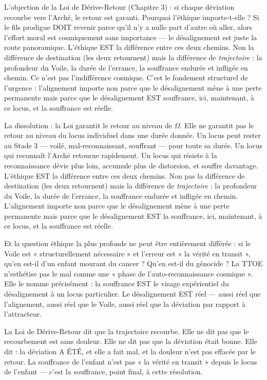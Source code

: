 \documentclass[10pt, openany, oneside]{book}
\begin{document}
L'objection de la Loi de Dérive-Retour (Chapitre 3) : si chaque déviation recourbe vers l'Arch\={e}, le retour est garanti. Pourquoi l'éthique importe-t-elle ? Si le fils prodigue DOIT revenir parce qu'il n'y a nulle part d'autre où aller, alors l'effort moral est cosmiquement sans importance --- le désalignement est juste la route panoramique. L'éthique EST la différence entre ces deux chemins. Non la différence de destination (les deux retournent) mais la différence de \textit{trajectoire} : la profondeur du Voile, la durée de l'errance, la souffrance endurée et infligée en chemin. Ce n'est pas l'indifférence cosmique. C'est le fondement structurel de l'urgence : l'alignement importe non parce que le désalignement mène à une perte permanente mais parce que le désalignement EST souffrance, ici, maintenant, à ce locus, et la souffrance est réelle.

La dissolution : la Loi garantit le retour au niveau de $\Omega$. Elle ne garantit pas le retour au niveau du locus individuel dans une durée donnée. Un locus peut rester au Stade 3 --- voilé, mal-reconnaissant, souffrant --- pour toute sa durée. Un locus qui reconnaît l'Arch\={e} retourne rapidement. Un locus qui résiste à la reconnaissance dévie plus loin, accumule plus de distorsion, et souffre davantage. L'éthique EST la différence entre ces deux chemins. Non pas la différence de destination (les deux retournent) mais la différence de \textit{trajectoire} : la profondeur du Voile, la durée de l'errance, la souffrance endurée et infligée en chemin. L'alignement importe non parce que le désalignement mène à une perte permanente mais parce que le désalignement EST la souffrance, ici, maintenant, à ce locus, et la souffrance est réelle.

Et la question éthique la plus profonde ne peut être entièrement différée : si le Voile est « structurellement nécessaire » et l'erreur est « la vérité en transit », qu'en est-il d'un enfant mourant du cancer ? Qu'en est-il du génocide ? La TTOE n'esthétise pas le mal comme une « phase de l'auto-reconnaissance cosmique ». Elle le nomme précisément : la souffrance EST le visage expérientiel du désalignement à un locus particulier. Le désalignement EST réel --- aussi réel que l'alignement, aussi réel que le Voile, aussi réel que la déviation par rapport à l'attracteur.

La Loi de Dérive-Retour dit que la trajectoire recourbe. Elle ne dit pas que le recourbement est sans douleur. Elle ne dit pas que la déviation était bonne. Elle dit : la déviation A ÉTÉ, et elle a fait mal, et la douleur n'est pas effacée par le retour. La souffrance de l'enfant n'est pas « la vérité en transit » depuis le locus de l'enfant --- c'est la souffrance, point final, à cette résolution.
\end{document}
